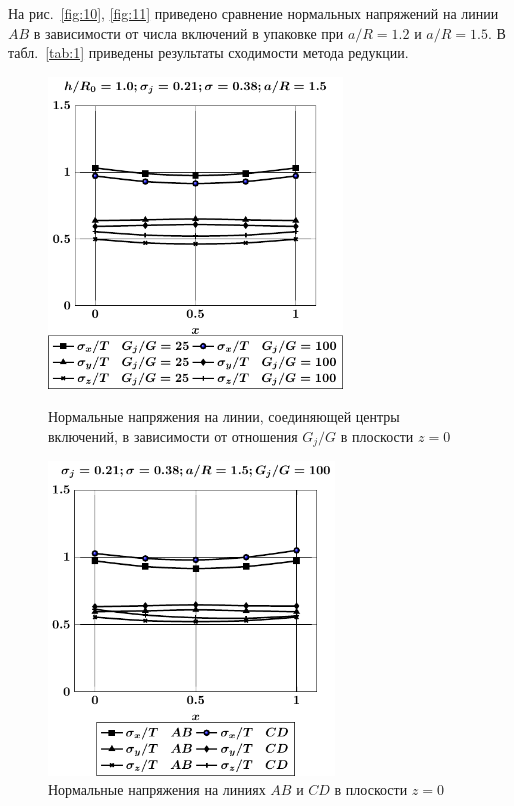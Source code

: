 На рис.~\ref{fig:10}, \ref{fig:11} приведено сравнение нормальных напряжений на линии $AB$ в зависимости от числа включений в упаковке при $a/R=1.2$ и $a/R=1.5$. В табл.~\ref{tab:1} приведены результаты сходимости метода редукции.

\begin{figure}[h!]
\centering\footnotesize
\parbox[b]{7.5cm}{\centering\includegraphics[width=7.8cm]{inc16-g-h10-r10-z0.pdf}
\caption{Нормальные напряжения на линии, соединяющей центры включений, в зависимости от отношения $G_j/G$ в плоскости $z=0$
\label{fig:8}}}\hfil\hfil
\parbox[b]{7.5cm}{\centering\includegraphics[width=7.6cm]{inc16-(ab-cd)-h10-r10-g100-z0.pdf}
\caption{Нормальные напряжения на линиях $AB$ и $CD$ в плоскости $z=0$
\label{fig:9}
}}
\end{figure}

